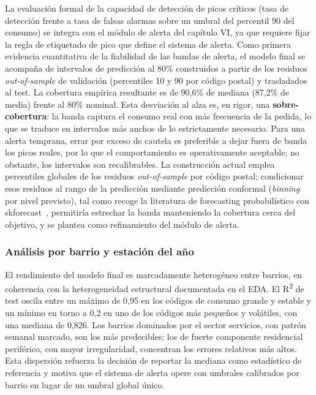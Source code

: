 \documentclass[12pt, a4paper]{article}
\begin{document}
La evaluación formal de la capacidad de detección de picos críticos (tasa de detección frente a tasa de falsas alarmas sobre un umbral del percentil 90 del consumo) se integra con el módulo de alerta del capítulo VI, ya que requiere fijar la regla de etiquetado de pico que define el sistema de alerta. Como primera evidencia cuantitativa de la fiabilidad de las bandas de alerta, el modelo final se acompaña de intervalos de predicción al 80\% construidos a partir de los residuos \textit{out-of-sample} de validación (percentiles 10 y 90 por código postal) y trasladados al test. La cobertura empírica resultante es de 90,6\% de mediana (87,2\% de media) frente al 80\% nominal. Esta desviación al alza es, en rigor, una \textbf{sobre-cobertura}: la banda captura el consumo real con más frecuencia de la pedida, lo que se traduce en intervalos más anchos de lo estrictamente necesario. Para una alerta temprana, errar por exceso de cautela es preferible a dejar fuera de banda los picos reales, por lo que el comportamiento es operativamente aceptable; no obstante, los intervalos son recalibrables. La construcción actual emplea percentiles globales de los residuos \textit{out-of-sample} por código postal; condicionar esos residuos al rango de la predicción mediante predicción conformal (\textit{binning} por nivel previsto), tal como recoge la literatura de forecasting probabilístico con skforecast~\cite{skforecast}, permitiría estrechar la banda manteniendo la cobertura cerca del objetivo, y se plantea como refinamiento del módulo de alerta.

\subsubsection{Análisis por barrio y estación del año}


El rendimiento del modelo final es marcadamente heterogéneo entre barrios, en coherencia con la heterogeneidad estructural documentada en el EDA. El R\textsuperscript{2} de test oscila entre un máximo de 0,95 en los códigos de consumo grande y estable y un mínimo en torno a 0,2 en uno de los códigos más pequeños y volátiles, con una mediana de 0,826. Los barrios dominados por el sector servicios, con patrón semanal marcado, son los más predecibles; los de fuerte componente residencial periférico, con mayor irregularidad, concentran los errores relativos más altos. Esta dispersión refuerza la decisión de reportar la mediana como estadístico de referencia y motiva que el sistema de alerta opere con umbrales calibrados por barrio en lugar de un umbral global único.
\end{document}
